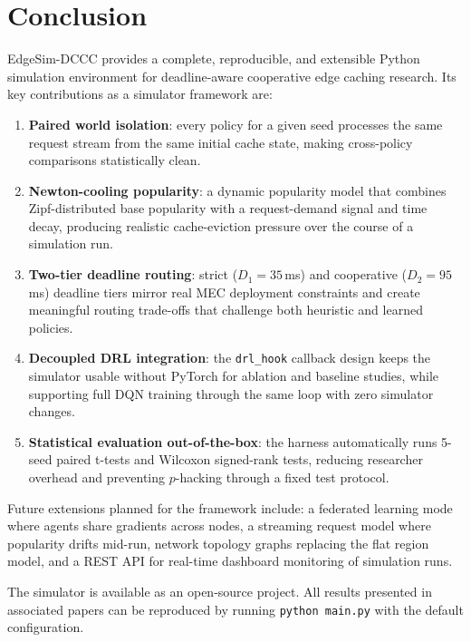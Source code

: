 \documentclass[12pt]{article}
\begin{document}
\section{Conclusion}
\label{sec:conclusion}

EdgeSim-DCCC provides a complete, reproducible, and extensible Python simulation environment for deadline-aware cooperative edge caching research. Its key contributions as a simulator framework are:

\begin{enumerate}[noitemsep]
  \item \textbf{Paired world isolation}: every policy for a given seed processes the same request stream from the same initial cache state, making cross-policy comparisons statistically clean.
  \item \textbf{Newton-cooling popularity}: a dynamic popularity model that combines Zipf-distributed base popularity with a request-demand signal and time decay, producing realistic cache-eviction pressure over the course of a simulation run.
  \item \textbf{Two-tier deadline routing}: strict ($D_1 = 35$\,ms) and cooperative ($D_2 = 95$\,ms) deadline tiers mirror real MEC deployment constraints and create meaningful routing trade-offs that challenge both heuristic and learned policies.
  \item \textbf{Decoupled DRL integration}: the \texttt{drl\_hook} callback design keeps the simulator usable without PyTorch for ablation and baseline studies, while supporting full DQN training through the same loop with zero simulator changes.
  \item \textbf{Statistical evaluation out-of-the-box}: the harness automatically runs 5-seed paired t-tests and Wilcoxon signed-rank tests, reducing researcher overhead and preventing $p$-hacking through a fixed test protocol.
\end{enumerate}

Future extensions planned for the framework include: a federated learning mode where agents share gradients across nodes, a streaming request model where popularity drifts mid-run, network topology graphs replacing the flat region model, and a REST API for real-time dashboard monitoring of simulation runs.

The simulator is available as an open-source project. All results presented in associated papers can be reproduced by running \texttt{python main.py} with the default configuration.

\appendix
\end{document}
